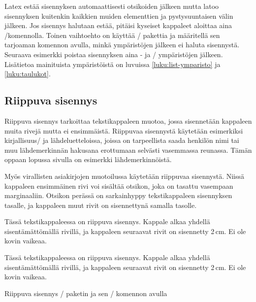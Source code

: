 Latex estää sisennyksen automaattisesti otsikoiden jälkeen mutta latoo
sisennyksen kuitenkin kaikkien muiden elementtien ja pystysuuntaisen
välin jälkeen. Jos sisennys halutaan estää, pitäisi kyseiset kappaleet
aloittaa aina \-/komennolla. Toinen vaihtoehto on
käyttää \-/ pakettia ja
määritellä sen tarjoaman komennon avulla, minkä ympäristöjen jälkeen ei
haluta sisennystä. Seuraava esimerkki poistaa sisennyksen aina
- ja \-/ ympäristöjen jälkeen.
Lisätietoa mainituista ympäristöistä on luvuissa
\ref{luku:list-ymparisto} ja \ref{luku:taulukot}.

\begin{koodilohkosis}
\end{koodilohkosis}

\subsection{Riippuva sisennys}
\label{luku:riippuva_sisennys}

Riippuva sisennys tarkoittaa tekstikappaleen muotoa, jossa sisennetään
kappaleen muita rivejä mutta ei ensimmäistä. Riippuvaa sisennystä
käytetään esimerkiksi kirjallisuus\-/{} ja lähdeluetteloissa, joissa on
tarpeellista saada henkilön nimi tai muu lähdemerkinnän hakusana
erottumaan selvästi vasemmassa reunassa. Tämän oppaan lopussa sivulla
\pageref{luku:kirjallisuutta} on esimerkki lähdemerkinnöistä.

Myös virallisten asiakirjojen muotoilussa käytetään riippuvaa
sisennystä. Niissä kappaleen ensimmäinen rivi voi sisältää otsikon, joka
on tasattu vasempaan marginaaliin. Otsikon perässä on sarkainhyppy
tekstikappaleen sisennyksen tasalle, ja kappaleen muut rivit on
sisennettynä samalla tasolle.

\begin{esimerkki*}
  \komentoi{,}

\begin{koodilohko}
Tässä tekstikappaleessa on riippuva sisennys. Kappale
alkaa yhdellä sisentämättömällä rivillä, ja kappaleen seuraavat rivit
on sisennetty 2\,cm. Ei ole kovin vaikeaa.
\end{koodilohko}
  \begin{tulos}
    Tässä tekstikappaleessa on riippuva sisennys. Kappale
    alkaa yhdellä sisentämättömällä rivillä, ja kappaleen seuraavat rivit
    on sisennetty 2\,cm. Ei ole kovin vaikeaa.
  \end{tulos}
  \caption{Riippuva sisennys \-/ paketin ja sen
    \-/ komennon avulla}
  \label{esim:riippuva_sis_hangpara}
\end{esimerkki*}

